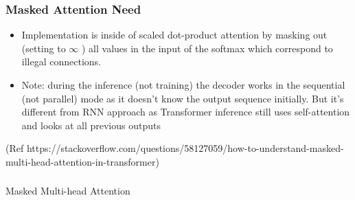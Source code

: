 \begin{frame}[fragile]\frametitle{Masked Attention Need}


\begin{itemize}
  \item   Implementation is inside of scaled dot-product attention by masking out (setting to $\infty$ ) all values in the input of the softmax which correspond to illegal connections.
  \item Note: during the inference (not training) the decoder works in the sequential (not parallel) mode as it doesn't know the output sequence initially. But it's different from RNN approach as Transformer inference still uses self-attention and looks at all previous outputs
\end{itemize}

{\tiny (Ref https://stackoverflow.com/questions/58127059/how-to-understand-masked-multi-head-attention-in-transformer)}

\end{frame}

\begin{frame}[fragile]\frametitle{}
\begin{center}
{\Large Masked Multi-head Attention}
\end{center}
\end{frame}

